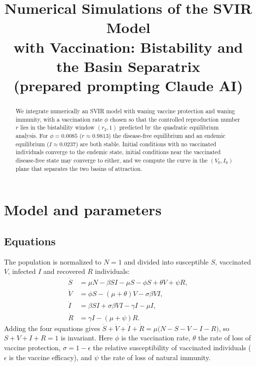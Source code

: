 \documentclass[11pt]{article}
\title{Numerical Simulations of the SVIR Model\\
with Vaccination: Bistability and the Basin Separatrix\\(prepared prompting Claude AI)}
\date{}
\begin{document}
\maketitle

\begin{abstract}
We integrate numerically an SVIR model with waning vaccine protection and waning immunity, with a vaccination rate $\phi$ chosen so that the controlled reproduction number $r$ lies in the bistability window $(r_2,1)$ predicted by the quadratic equilibrium analysis. For $\phi=0.0085$ ($r\approx0.9813$) the disease-free equilibrium and an endemic equilibrium ($I\approx0.0237$) are both stable. Initial conditions with no vaccinated individuals converge to the endemic state, initial conditions near the vaccinated disease-free state may converge to either, and we compute the curve in the $(V_0,I_0)$ plane that separates the two basins of attraction.
\end{abstract}

\section{Model and parameters}

\subsection{Equations}

The population is normalized to $N=1$ and divided into susceptible $S$, vaccinated $V$, infected $I$ and recovered $R$ individuals:
\begin{align}
\dot S &= \mu N-\beta SI-\mu S-\phi S+\theta V+\psi R,\nonumber\\
\dot V &= \phi S-(\mu+\theta)V-\sigma\beta VI,\label{eq:sys}\\
\dot I &= \beta SI+\sigma\beta VI-\gamma I-\mu I,\nonumber\\
\dot R &= \gamma I-(\mu+\psi)R.\nonumber
\end{align}
Adding the four equations gives $\dot S+\dot V+\dot I+\dot R=\mu\big(N-S-V-I-R\big)$, so $S+V+I+R=1$ is invariant. Here $\phi$ is the vaccination rate, $\theta$ the rate of loss of vaccine protection, $\sigma=1-\epsilon$ the relative susceptibility of vaccinated individuals ($\epsilon$ is the vaccine efficacy), and $\psi$ the rate of loss of natural immunity.
\end{document}
